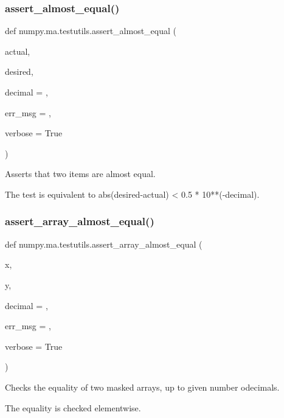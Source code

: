 \subsubsection{\texorpdfstring{assert\+\_\+almost\+\_\+equal()}{assert\_almost\_equal()}}
{\footnotesize\ttfamily def numpy.\+ma.\+testutils.\+assert\+\_\+almost\+\_\+equal (\begin{DoxyParamCaption}\item[{}]{actual,  }\item[{}]{desired,  }\item[{}]{decimal = {},  }\item[{}]{err\+\_\+msg = {\ttfamily \textquotesingle{}\textquotesingle{}},  }\item[{}]{verbose = {\ttfamily True} }\end{DoxyParamCaption})}

\begin{DoxyVerb}Asserts that two items are almost equal.

The test is equivalent to abs(desired-actual) < 0.5 * 10**(-decimal).\end{DoxyVerb}
 \mbox{\label{namespacenumpy_1_1ma_1_1testutils_af045714a2168bc5b4c62169632355210}} 
\subsubsection{\texorpdfstring{assert\+\_\+array\+\_\+almost\+\_\+equal()}{assert\_array\_almost\_equal()}}
{\footnotesize\ttfamily def numpy.\+ma.\+testutils.\+assert\+\_\+array\+\_\+almost\+\_\+equal (\begin{DoxyParamCaption}\item[{}]{x,  }\item[{}]{y,  }\item[{}]{decimal = {},  }\item[{}]{err\+\_\+msg = {\ttfamily \textquotesingle{}\textquotesingle{}},  }\item[{}]{verbose = {\ttfamily True} }\end{DoxyParamCaption})}

\begin{DoxyVerb}Checks the equality of two masked arrays, up to given number odecimals.

The equality is checked elementwise.\end{DoxyVerb}
 \mbox{\label{namespacenumpy_1_1ma_1_1testutils_a4a03954c84c9d6dba64bcd2529c4a98d}} 
